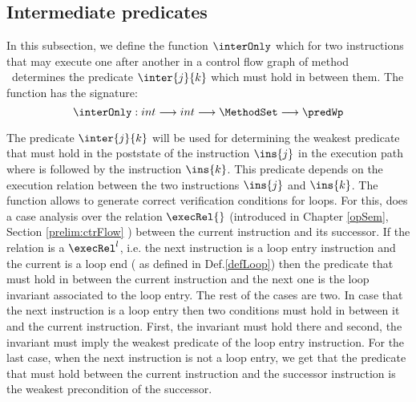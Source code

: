 \newtheorem{defInter}{Definition}[subsection]
\subsection{Intermediate predicates} \label{wp:interPred}
In this subsection, we define the function $\interOnly$ which for two instructions that may execute one
after another in a control flow graph  of  method \methodd \ determines the predicate $\inter{j}{k}$ which must hold in between them.
The function has the signature:
$$ \interOnly: int \longrightarrow int  \longrightarrow \MethodSet \longrightarrow \predWp $$ 


 The predicate $\inter{j}{k}$ will be used for determining the weakest predicate that must hold in the poststate of the instruction
 $\ins{j}$ in the execution path where   is followed by the instruction $\ins{k}$.
 This predicate depends on the execution relation between the two instructions $\ins{j}$ and $\ins{k}$.
 The function \interOnly{} allows to generate correct verification conditions for loops. For this,  \interOnly{} does a case analysis 
 over the relation $\execRel{}$ (introduced  in Chapter \ref{opSem}, Section \ref{prelim:ctrFlow} ) between the current instruction and its successor.
 If the relation is a $\execRel^{l}$, i.e. the next instruction is a loop entry instruction and the current is a loop end
( as defined in Def.\ref{defLoop}) 
 then the predicate that must hold in between the current instruction and the next one is the loop invariant associated to the loop entry.
The rest of the cases are two. In case that the next instruction is a loop entry then two conditions must hold in between it and the
current instruction. First, the invariant must hold there and second, the invariant must imply the weakest predicate of the loop entry instruction.
For the last case, when the next instruction is not a loop entry, we get that the predicate that must hold between the current instruction 
and the successor instruction is the weakest precondition of the successor.  


